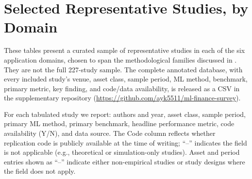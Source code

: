\section{Selected Representative Studies, by Domain}\label{sec:appendix_tables}

These tables present a curated sample of representative studies in each of
the six application domains, chosen to span the methodological families
discussed in . They are not the full 227-study sample.
The complete annotated database, with every included study's venue, asset
class, sample period, ML method, benchmark, primary metric, key finding,
and code/data availability, is released as a CSV in the supplementary
repository (\url{https://github.com/ayk5511/ml-finance-survey}).

For each tabulated study we report: authors and year, asset class, sample period, primary ML method, primary benchmark, headline performance metric, code availability (Y/N), and data source. The Code column reflects whether replication code is publicly available at the time of writing; ``--'' indicates the field is not applicable (e.g., theoretical or simulation-only studies). Asset and period entries shown as ``--'' indicate either non-empirical studies or study designs where the field does not apply.

\renewcommand{\arraystretch}{1.1}
\setlength{\tabcolsep}{3pt}
\scriptsize
\sloppy


